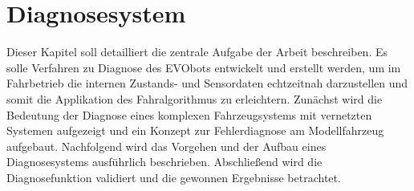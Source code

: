 \begin{comment}
TODO:
--> Bildquellen überprüfen
--> Referenzen zu Bilder, Tabellen und Quellen im Text prüfen
--> Einarbeitungleitfaden ergänzen: neuer Knoten anlegen, Directory builden usw aus Fabis Anleitung
--> Einarbeitungleitfaden ergänzen: Midnight Commander 

--> Kapitel zur Fernsteuerung des EVObots: zuerst via VNC Client Desktop gespiegelt, um mobil ohne Bildschirm und Maus/Tastatur auf Gerät arbeiten zu können. Später hat sich aber gezeigt, dass Grafikberechnung und Übertragung des Desktops zu viel Rechenleistung benötigt, wodurch Rechenleistung von ROS reduziert wird, demnach kamen Algorithmen zum Spurhalten dem realen Verhalten nicht hinterher, deshalb Zeitverzug und keine Spurregelung möglich! Umstieg auf SSH zugriff via Terminal auf PC, grafische Benutzeroberfläche auf Ubuntu deaktiviert, um sämtliche Ressourcen für ROS zu generieren. Ergebnis zeigt echtzeitgetreue Spurerfassung und Regelung!

CAN-to-WiFi Gateway mit PaspberryPi oder Ardiuno möglich

Mehr Zustandsüberwachungssystem als Diagnosesystem 

Off-Board-Kommunikation als Diagnose in ISO Schicht 7 geregelt 

Generierung von Diagnosedaten ist von Beginn der Entwicklung an essentiell, um spätere Komplexität zu beherrschen. 

Fehler sind üblich in komplexen Systemen. Sollten vermieden werden, kommen aber unter bestimmten Bedingungen und Voraussetzungen vor. Abhängig von Implementierung, Fehlervermeidung usw. Fale-Safe-Zustand. Fehlerzustand, Fehlerwirkung
Wie äußert sich Fehler oder Fehlfunktion? --> unplausibler Signalwert, falscher Wert oder out of range

Abweichung zum SOLL ist nicht unbedingt programmseitiger Fehler, sondern kann aus Logikfunktion des Programmierers folgen. 
\end{comment}



\chapter{Diagnosesystem} \label{cha:Diagnosesystem}

Dieser Kapitel soll detailliert die zentrale Aufgabe der Arbeit beschreiben. Es solle Verfahren zu Diagnose des EVObots entwickelt und erstellt werden, um im Fahrbetrieb die internen Zustands- und Sensordaten echtzeitnah darzustellen und somit die Applikation des Fahralgorithmus zu erleichtern. 
Zunächst wird die Bedeutung der Diagnose eines komplexen Fahrzeugsystems mit vernetzten Systemen aufgezeigt und ein Konzept zur Fehlerdiagnose am Modellfahrzeug aufgebaut. Nachfolgend wird das Vorgehen und der Aufbau eines Diagnosesystems ausführlich beschrieben. Abschließend wird die Diagnosefunktion validiert und die gewonnen Ergebnisse betrachtet. 

